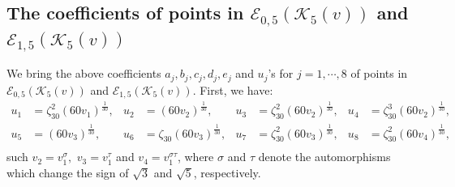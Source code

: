 \documentclass[11pt]{amsart}
\newcommand{\Ee}{{\mathcal E}}
\newcommand{\KK}{{\mathcal K}}
\numberwithin{equation}{section}
\numberwithin{table}{section}
\newcommand\<{\langle}
\begin{document}
\subsection{The coefficients of  points in $\Ee_{0, 5}(\KK_5(v))$ and  $\Ee_{1, 5}(\KK_5(v))$}
\label{a0-5}

We bring the above coefficients $a_j, b_j, c_j, d_j, e_j$  and  $u_j$'s for $j=1,\cdots, 8$  of  points in $\Ee_{0, 5}(\KK_5(v))$ and  $\Ee_{1, 5}(\KK_5(v))$.
First, we have:
\begin{equation}
	\label{u-0-8}
	\begin{aligned}
		u_1 & =  \zeta_{30}^2(60 v_1)^\frac{1}{30}, &  u_2 & = (60 v_2)^\frac{1}{30}, &
		u_3 & =  \zeta_{30}^2(60 v_2)^\frac{1}{30}, & u_4 & =  \zeta_{30}^3(60 v_2)^\frac{1}{30}, \\
		u_5 & =  (60 v_3)^\frac{1}{30},  & u_6 & =  \zeta_{30}(60 v_3)^\frac{1}{30}, & 
		u_7 &=  \zeta_{30}^2(60 v_3)^\frac{1}{30},  &  u_8 &=  \zeta_{30}^2(60 v_4)^\frac{1}{30},\\
	\end{aligned}
\end{equation}
such $v_2=v_1^\sigma,$ $v_3=v_1^\tau$ and $v_4=v_1^{\sigma \tau}$, where  $\sigma$ and $\tau$ denote the  automorphisms which change the sign of  $\sqrt{3}$ and  $\sqrt{5}$, respectively.
\end{document}
